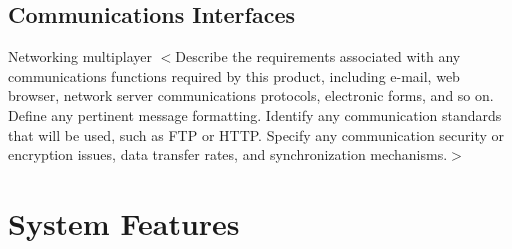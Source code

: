 \documentclass{scrreprt}
\begin{document}
\section{Communications Interfaces}
Networking multiplayer
$<$Describe the requirements associated with any communications functions 
required by this product, including e-mail, web browser, network server 
communications protocols, electronic forms, and so on. Define any pertinent 
message formatting. Identify any communication standards that will be used, such 
as FTP or HTTP. Specify any communication security or encryption issues, data 
transfer rates, and synchronization mechanisms.$>$


\chapter{System Features}


%

\end{document}
